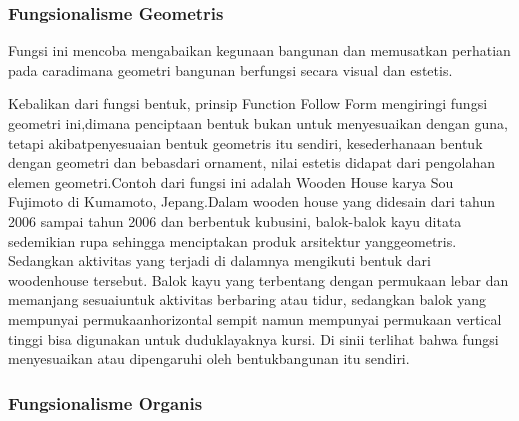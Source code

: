 \documentclass[../manperil.tex]{subfiles}
\begin{document}
\subsubsection{Fungsionalisme Geometris}%
\label{sub:fungsionalisme_geometris}


Fungsi ini mencoba mengabaikan kegunaan bangunan dan memusatkan perhatian pada caradimana geometri bangunan berfungsi secara visual dan estetis.

Kebalikan dari fungsi bentuk, prinsip Function Follow Form mengiringi fungsi geometri ini,dimana penciptaan bentuk bukan untuk menyesuaikan dengan guna, tetapi akibatpenyesuaian bentuk geometris itu sendiri, kesederhanaan bentuk dengan geometri dan bebasdari ornament, nilai estetis didapat dari pengolahan elemen geometri.Contoh dari fungsi ini adalah Wooden House karya Sou Fujimoto di Kumamoto, Jepang.Dalam wooden house yang didesain dari tahun 2006 sampai tahun 2006 dan berbentuk kubusini, balok-balok kayu ditata sedemikian rupa sehingga menciptakan produk arsitektur yanggeometris. Sedangkan aktivitas yang terjadi di dalamnya mengikuti bentuk dari woodenhouse tersebut. Balok kayu yang terbentang dengan permukaan lebar dan memanjang sesuaiuntuk aktivitas berbaring atau tidur, sedangkan balok yang mempunyai permukaanhorizontal sempit namun mempunyai permukaan vertical tinggi bisa digunakan untuk duduklayaknya kursi. Di sinii terlihat bahwa fungsi menyesuaikan atau dipengaruhi oleh bentukbangunan itu sendiri.

\subsubsection{Fungsionalisme Organis}%
\label{ssub:fungsionalisme_organis}
\end{document}
